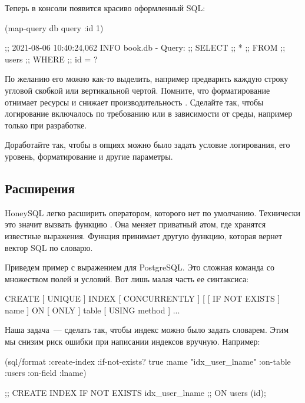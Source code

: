 Теперь в консоли появится красиво оформленный SQL:

\begin{english}
  \begin{clojure}
(map-query db query {:id 1})

;; 2021-08-06 10:40:24,062 INFO  book.db - Query:
;; SELECT
;;  *
;; FROM
;;   users
;; WHERE
;;  id = ?
  \end{clojure}
\end{english}

По желанию его можно как-то выделить, например предварить каждую строку угловой скобкой или вертикальной чертой. Помните, что форматирование отнимает ресурсы и снижает производительность . Сделайте так, чтобы логирование включалось по требованию или в зависимости от среды, например только при разработке.

Доработайте  так, чтобы в опциях можно было задать условие логирования, его уровень, форматирование и другие параметры.

\subsection{Расширения}


HoneySQL легко расширить оператором, которого нет по умолчанию. Технически это значит вызвать функцию . Она меняет приватный атом, где хранятся известные выражения. Функция принимает другую функцию, которая вернет вектор SQL по словарю.

Приведем пример с выражением  для PostgreSQL. Это сложная команда со множеством полей и условий. Вот лишь малая часть ее синтаксиса:

\begin{english}
  \begin{sql}
CREATE [ UNIQUE ]
    INDEX [ CONCURRENTLY ]
    [ [ IF NOT EXISTS ] name ]
    ON [ ONLY ] table
    [ USING method ]
    ...
  \end{sql}
\end{english}

Наша задача~--- сделать так, чтобы индекс можно было задать словарем. Этим мы снизим риск ошибки при написании индексов вручную. Например:

\begin{english}
  \begin{clojure}
(sql/format
  {:create-index
    {:if-not-exists? true
     :name "idx_user_lname"
     :on-table :users
     :on-field :lname}})

;; CREATE INDEX IF NOT EXISTS idx_user_lname
;; ON users (id);
  \end{clojure}
\end{english}

